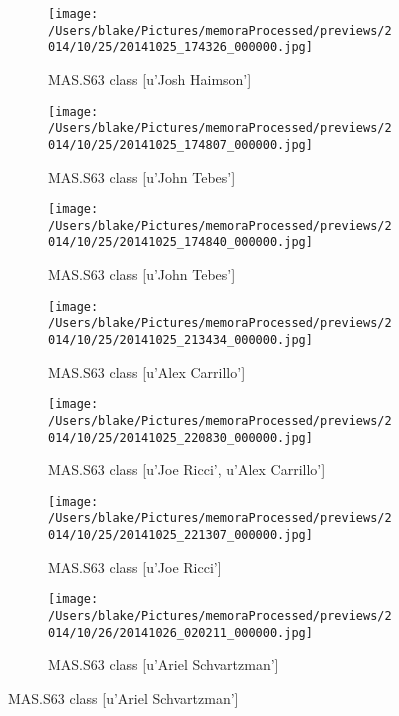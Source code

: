 \documentclass{article}
\begin{document}
\begin{figure}
\begin{subfigure}{.25\textwidth}\centering\texttt{[image: /Users/blake/Pictures/memoraProcessed/previews/2014/10/25/20141025\_174326\_000000.jpg]}\caption{MAS.S63 class
[u'Josh Haimson']}\end{subfigure}
\begin{subfigure}{.25\textwidth}\centering\texttt{[image: /Users/blake/Pictures/memoraProcessed/previews/2014/10/25/20141025\_174807\_000000.jpg]}\caption{MAS.S63 class
[u'John Tebes']}\end{subfigure}
\begin{subfigure}{.25\textwidth}\centering\texttt{[image: /Users/blake/Pictures/memoraProcessed/previews/2014/10/25/20141025\_174840\_000000.jpg]}\caption{MAS.S63 class
[u'John Tebes']}\end{subfigure}
\begin{subfigure}{.25\textwidth}\centering\texttt{[image: /Users/blake/Pictures/memoraProcessed/previews/2014/10/25/20141025\_213434\_000000.jpg]}\caption{MAS.S63 class
[u'Alex Carrillo']}\end{subfigure}
\begin{subfigure}{.25\textwidth}\centering\texttt{[image: /Users/blake/Pictures/memoraProcessed/previews/2014/10/25/20141025\_220830\_000000.jpg]}\caption{MAS.S63 class
[u'Joe Ricci', u'Alex Carrillo']}\end{subfigure}
\begin{subfigure}{.25\textwidth}\centering\texttt{[image: /Users/blake/Pictures/memoraProcessed/previews/2014/10/25/20141025\_221307\_000000.jpg]}\caption{MAS.S63 class
[u'Joe Ricci']}\end{subfigure}
\begin{subfigure}{.25\textwidth}\centering\texttt{[image: /Users/blake/Pictures/memoraProcessed/previews/2014/10/26/20141026\_020211\_000000.jpg]}\caption{MAS.S63 class
[u'Ariel Schvartzman']}\end{subfigure}

\end{figure}
\end{document}

